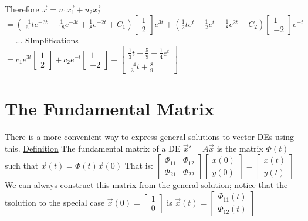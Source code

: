 \documentclass[12pt]{article}
\begin{document}
	Therefore $\overrightarrow{x} = u_1\overrightarrow{x_1} + u_2 \overrightarrow{x_2}$\\
	$= (\frac{-1}{6}te^{-3t} - \frac{1}{18}e^{-3t} + \frac{1}{8}e^{-2t} + C_1)\begin{bmatrix}1 \\ 2 \end{bmatrix}e^{3t} + (\frac{1}{2}te^t - \frac{1}{2}e^t - \frac{1}{8}e^{2t} + C_2)\begin{bmatrix} 1 \\ -2 \end{bmatrix}e^{-t}$\\
	$= ...$ SImplifications\\
	$= c_1e^{3t}\begin{bmatrix}1 \\ 2\end{bmatrix} + c_2e^{-t}\begin{bmatrix} 1 \\ -2 \end{bmatrix} + \begin{bmatrix} \frac{1}{3}t - \frac{5}{9} - \frac{1}{4}e^t \\ \frac{-4}{3}t + \frac{8}{9} \end{bmatrix}$\\
	
	
	\section*{The Fundamental Matrix}
	There is a more convenient way to express general solutions to vector DEs using this.
	\underline{Definition} The fundamental matrix of a DE $\overrightarrow{x}' = A\overrightarrow{x}$ is the matrix $\Phi(t)$ such that $\overrightarrow{x}(t) = \Phi(t)\overrightarrow{x}(0)$ That is: $\begin{bmatrix} \Phi_{11} & \Phi_{12} \\ \Phi_{21} & \Phi_{22} \end{bmatrix}\begin{bmatrix}x(0) \\ y(0) \end{bmatrix} = \begin{bmatrix} x(t) \\ y(t) \end{bmatrix}$\\
	
	We can always construct this matrix from the general solution; notice that the tsolution to the special case $\overrightarrow{x}(0) = \begin{bmatrix} 1 \\ 0 \end{bmatrix}$ is $\overrightarrow{x}(t) = \begin{bmatrix}\Phi_{11}(t) \\ \Phi_{12}(t) \end{bmatrix}$\\
	
\end{document}
